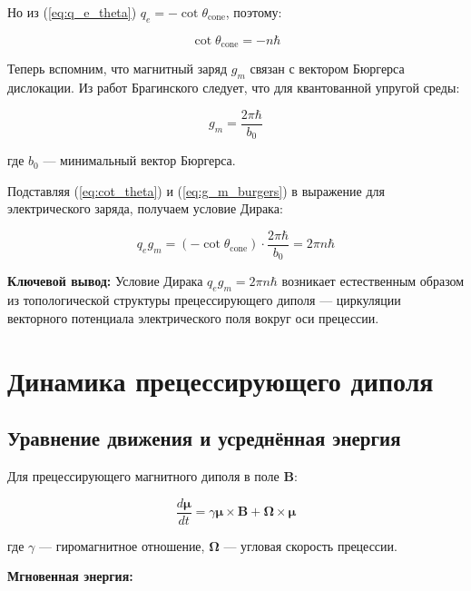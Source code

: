 \documentclass[12pt]{article}
\begin{document}
Но из (\ref{eq:q_e_theta}) $q_e = -\cot\theta_{\text{cone}}$, поэтому:

\begin{equation}
\cot\theta_{\text{cone}} = -n \hbar
\label{eq:cot_theta}
\end{equation}

Теперь вспомним, что магнитный заряд $g_m$ связан с вектором Бюргерса дислокации. Из работ Брагинского следует, что для квантованной упругой среды:

\begin{equation}
g_m = \frac{2\pi \hbar}{b_0}
\label{eq:g_m_burgers}
\end{equation}

где $b_0$ — минимальный вектор Бюргерса.

Подставляя (\ref{eq:cot_theta}) и (\ref{eq:g_m_burgers}) в выражение для электрического заряда, получаем условие Дирака:

\begin{equation}
q_e g_m = (-\cot\theta_{\text{cone}}) \cdot \frac{2\pi \hbar}{b_0} = 2\pi n \hbar
\label{eq:dirac_condition_derived}
\end{equation}

\textbf{Ключевой вывод:} Условие Дирака $q_e g_m = 2\pi n \hbar$ возникает естественным образом из топологической структуры прецессирующего диполя — циркуляции векторного потенциала электрического поля вокруг оси прецессии.

\section{Динамика прецессирующего диполя}

\subsection{Уравнение движения и усреднённая энергия}

Для прецессирующего магнитного диполя в поле $\boldsymbol{B}$:

\begin{equation}
\frac{d\boldsymbol{\mu}}{dt} = \gamma \boldsymbol{\mu} \times \boldsymbol{B} + \boldsymbol{\Omega} \times \boldsymbol{\mu}
\label{eq:equation_of_motion}
\end{equation}

где $\gamma$ — гиромагнитное отношение, $\boldsymbol{\Omega}$ — угловая скорость прецессии.

\textbf{Мгновенная энергия:}
\end{document}
